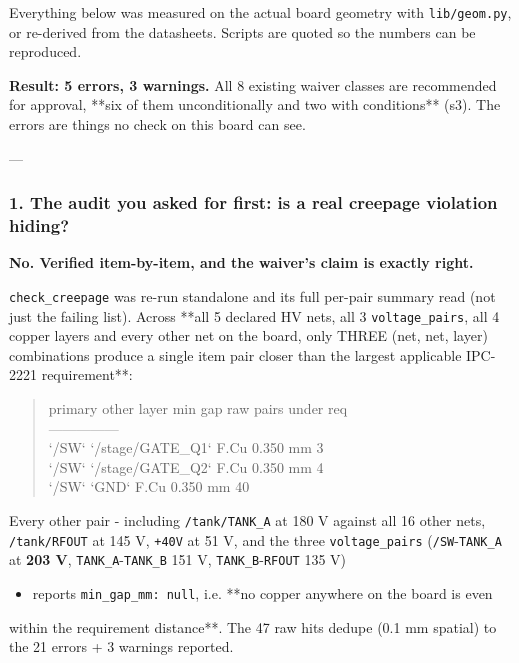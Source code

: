 \documentclass[11pt,a4paper]{article}
\begin{document}
Everything below was measured on the actual board geometry with \texttt{lib/geom.py}, or re-derived from the datasheets. Scripts are quoted so the numbers can be reproduced.

\textbf{Result: 5 errors, 3 warnings.} All 8 existing waiver classes are recommended for approval, {*}{*}six of them unconditionally and two with conditions{*}{*} (s3). The errors are things no check on this board can see.

---

\subsubsection*{1. The audit you asked for first: is a real creepage violation hiding?}
\textbf{No. Verified item-by-item, and the waiver's claim is exactly right.}

\texttt{check\_creepage} was re-run standalone and its full per-pair summary read (not just the failing list). Across {*}{*}all 5 declared HV nets, all 3 \texttt{voltage\_pairs}, all 4 copper layers and every other net on the board, only THREE (net, net, layer) combinations produce a single item pair closer than the largest applicable IPC-2221 requirement{*}{*}:

\begin{quote}\small\ttfamily\raggedright
\textbar{} primary \textbar{} other \textbar{} layer \textbar{} min gap \textbar{} raw pairs under req \textbar{}\\
\textbar{}---\textbar{}---\textbar{}---\textbar{}---\textbar{}---\textbar{}\\
\textbar{} `/SW` \textbar{} `/stage/GATE\_Q1` \textbar{} F.Cu \textbar{} 0.350 mm \textbar{} 3 \textbar{}\\
\textbar{} `/SW` \textbar{} `/stage/GATE\_Q2` \textbar{} F.Cu \textbar{} 0.350 mm \textbar{} 4 \textbar{}\\
\textbar{} `/SW` \textbar{} `GND` \textbar{} F.Cu \textbar{} 0.350 mm \textbar{} 40 \textbar{}
\end{quote}
Every other pair - including \texttt{/tank/TANK\_A} at 180 V against all 16 other nets, \texttt{/tank/RFOUT} at 145 V, \texttt{+40V} at 51 V, and the three \texttt{voltage\_pairs} (\texttt{/SW}-\texttt{TANK\_A} at \textbf{203 V}, \texttt{TANK\_A}-\texttt{TANK\_B} 151 V, \texttt{TANK\_B}-\texttt{RFOUT} 135 V)

\begin{itemize}
\item reports \texttt{min\_gap\_mm: null}, i.e. {*}{*}no copper anywhere on the board is even
\end{itemize}
within the requirement distance{*}{*}. The 47 raw hits dedupe (0.1 mm spatial) to the 21 errors + 3 warnings reported.
\end{document}
